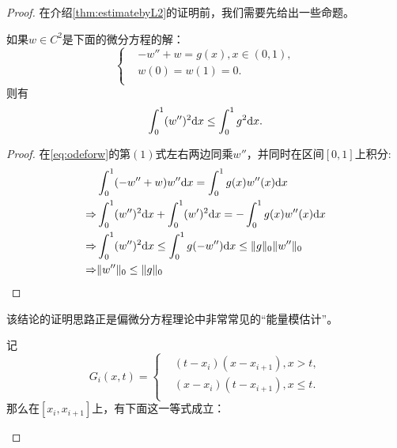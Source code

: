 \begin{proof}
在介绍\ref{thm:estimatebyL2}的证明前，我们需要先给出一些命题。
\newpage
\begin{proposition}
  \label{prop:enermy}
  如果$w\in C^{2}$是下面的微分方程的解：
  \begin{equation}
    \label{eq:odeforw}
    \left\{
      \begin{aligned}
        &-w''+w=g(x),x\in(0,1),\\
        &w(0)=w(1)=0.\\
      \end{aligned}
    \right.
  \end{equation}
  则有
  \begin{equation}
    \label{eq:enermy-norm}
  \int_{0}^{1}(w'')^{2}\mathrm{d} x\le\int_{0}^{1}g^{2}\mathrm{d} x.
  \end{equation}
\end{proposition}
\begin{proof}
  在\eqref{eq:odeforw}的第$(1)$式左右两边同乘$w''$，并同时在区间$[0,1]$上积分: 
  \begin{equation}
    \begin{aligned}
      &\int_{0}^{1}(-w''+w)w''\mathrm{d} x=\int_{0}^{1}g(x)w''(x)\mathrm{d} x\\
      \Rightarrow&\int_{0}^{1}(w'')^{2}\mathrm{d} x+\int_{0}^{1}(w')^{2}\mathrm{d} x=-\int_{0}^{1}g(x)w''(x)\mathrm{d} x\\
      \Rightarrow&\int_{0}^{1}(w'')^{2}\mathrm{d} x\le\int_{0}^{1}g(-w'')\mathrm{d} x\le \|g\|_{0}\|w''\|_{0}\\
      \Rightarrow&\|w''\|_{0}\le\|g\|_{0}\\
    \end{aligned}
  \end{equation}
\end{proof}
\begin{remark}
  该结论的证明思路正是偏微分方程理论中非常常见的“能量模估计”。
\end{remark}
\begin{proposition}
  \label{prop:Gxt}
  记
  \begin{equation}
    \label{eq:Gxt}
    G_{i}(x,t)=\left\{
      \begin{aligned}
        &(t-x_i)(x-x_{i+1}),x>t ,\\
        &(x-x_{i})(t-x_{i+1}),x\le t.\\
      \end{aligned}
    \right.
  \end{equation}
  那么在$[x_{i},x_{i+1}]$上，有下面这一等式成立：
  \begin{equation}

\end{equation}
\end{proposition}
\end{proof}
